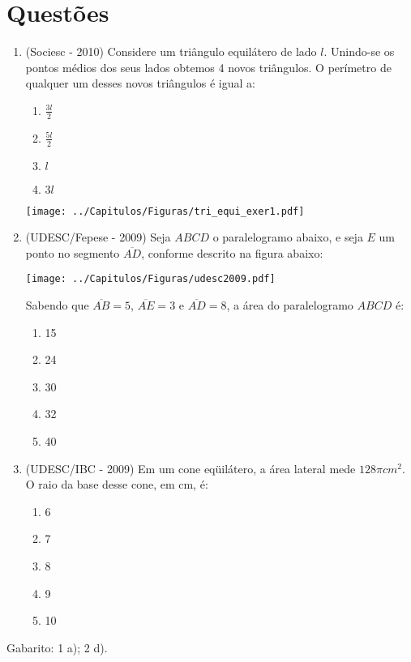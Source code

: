 
\section{Questões}

\begin{enumerate}
\item (Sociesc - 2010) Considere um triângulo equilátero de lado $l$. Unindo-se os pontos médios dos seus lados obtemos 4 novos triângulos. O perímetro de qualquer um desses novos triângulos é igual a:

 \begin{multicols}{2}

 \begin{enumerate}
  \item $\frac{3l}{2}$
  \item $\frac{5l}{2}$
  \item $l$
  \item $3l$
 \end{enumerate}

 \texttt{[image: ../Capitulos/Figuras/tri\_equi\_exer1.pdf]}

 \end{multicols}

  \item (UDESC/Fepese - 2009) Seja $ABCD$ o paralelogramo abaixo, e seja $E$ um ponto no segmento $\overline{AD}$, conforme descrito na figura abaixo:

  \begin{center}
 \texttt{[image: ../Capitulos/Figuras/udesc2009.pdf]}
 \end{center}

  Sabendo que $\overline{AB} = 5$, $\overline{AE} = 3$ e $\overline{AD} = 8$, a área do paralelogramo $ABCD$ é:
  \begin{enumerate}
  \item 15
  \item 24
  \item 30
  \item 32
  \item 40
 \end{enumerate}

 \item (UDESC/IBC - 2009) Em um cone eqüilátero, a área lateral mede $128 \pi cm^2$. O raio da base desse cone, em cm, é:
 \begin{enumerate}
  \item 6
  \item 7
  \item 8
  \item 9
  \item 10
 \end{enumerate}

 \end{enumerate}

 Gabarito: 1 a); 2 d).
